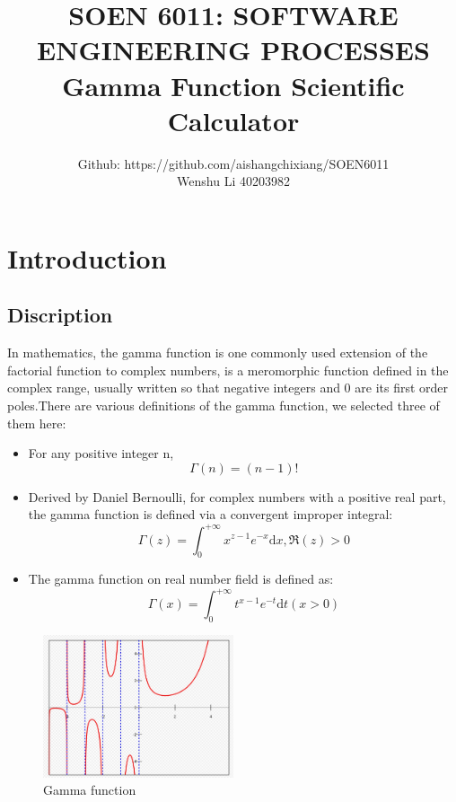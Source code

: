 \documentclass{report}
\begin{document}
\title{SOEN 6011: SOFTWARE ENGINEERING PROCESSES\\ Gamma Function Scientific Calculator}
\author{Github: https://github.com/aishangchixiang/SOEN6011\\Wenshu Li 40203982}
\maketitle






\tableofcontents
\newpage
\section{Introduction}
\subsection{Discription}
In mathematics, the gamma function is one commonly used extension of the factorial function to complex numbers\cite{enwiki:1102404428}, is a meromorphic function defined in the complex range, usually written so that negative integers and 0 are its first order poles.There are various definitions of the gamma function, we selected three of them here:
\begin{itemize}
\item For any positive integer n,
\\$$\Gamma \left ( n\right ) = \left ( n-1 \right )!$$
\item Derived by Daniel Bernoulli, for complex numbers with a positive real part, the gamma function is defined via a convergent improper integral:
\\$$\Gamma \left ( z\right ) = \int_{0}^{+\infty} x^{z-1} e^{-x}\mathrm{d}x,  \Re\left ( z \right )>0$$
\item The gamma function on real number field is defined as:
\\$$\Gamma \left ( x \right ) =\int_{0}^{+\infty } t^{x-1} e^{-t} \mathrm{d}t \left (  x>0\right ) $$
\end{itemize} 

\begin{figure}[h]
\caption{Gamma function}
\centering
\includegraphics[width=0.5\textwidth]{gamma}
\end{figure}
 
\end{document}
